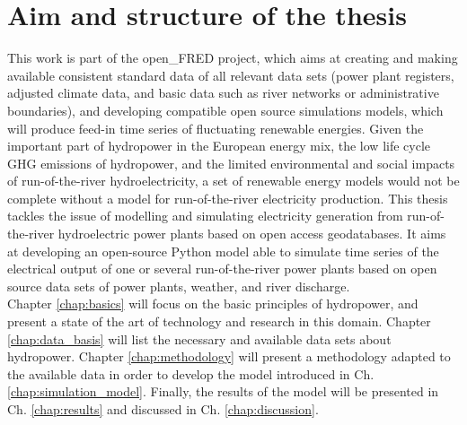 \section{Aim and structure of the thesis}
This work is part of the open\_FRED project, which aims at creating and making available consistent standard data of all relevant data sets (power plant registers, adjusted climate data, and basic data such as river networks or administrative boundaries), and developing compatible open source simulations models, which will produce feed-in time series of fluctuating renewable energies. \newline
Given the important part of hydropower in the European energy mix, the low life cycle GHG emissions of hydropower, and the limited environmental and social impacts of run-of-the-river hydroelectricity, a set of renewable energy models would not be complete without a model for run-of-the-river electricity production. \newline
This thesis tackles the issue of modelling and simulating electricity generation from run-of-the-river hydroelectric power plants based on open access geodatabases. It aims at developing an open-source Python model able to simulate time series of the electrical output of one or several run-of-the-river power plants based on open source data sets of power plants, weather, and river discharge. \\
Chapter \ref{chap:basics} will focus on the basic principles of hydropower, and present a state of the art of technology and research in this domain. Chapter \ref{chap:data_basis} will list the necessary and available data sets about hydropower. Chapter \ref{chap:methodology} will present a methodology adapted to the available data in order to develop the model introduced in Ch. \ref{chap:simulation_model}. Finally, the results of the model will be presented in Ch. \ref{chap:results} and discussed in Ch. \ref{chap:discussion}.

